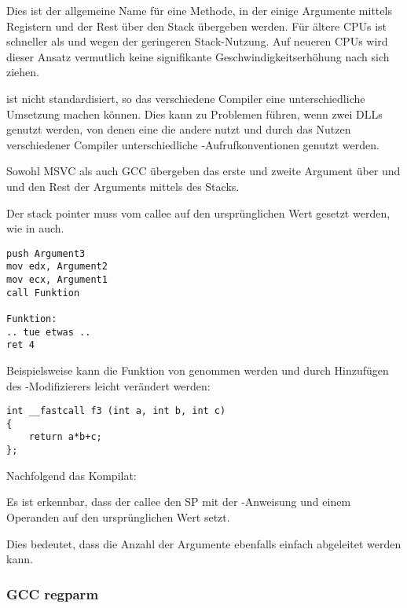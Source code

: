 Dies ist der allgemeine Name für eine Methode, in der einige Argumente mittels Registern und
der Rest über den Stack übergeben werden. Für ältere CPUs ist  schneller als
 und  wegen der geringeren Stack-Nutzung.
Auf neueren \ac{CPU}s wird dieser Ansatz vermutlich keine signifikante Geschwindigkeitserhöhung
nach sich ziehen.

 ist nicht standardisiert, so das verschiedene Compiler eine unterschiedliche
Umsetzung machen können.
Dies kann zu Problemen führen, wenn zwei DLLs genutzt werden, von denen eine die andere nutzt
und durch das Nutzen verschiedener Compiler unterschiedliche -Aufrufkonventionen
genutzt werden.

Sowohl MSVC als auch GCC übergeben das erste und zweite Argument über \ECX und \EDX und den Rest
der Arguments mittels des Stacks.

Der \gls{stack pointer} muss vom \gls{callee} auf den ursprünglichen Wert gesetzt werden,
wie in  auch.

\begin{lstlisting}[caption=fastcall]
push Argument3
mov edx, Argument2
mov ecx, Argument1
call Funktion

Funktion:
.. tue etwas ..
ret 4
\end{lstlisting}

Beispielsweise kann die Funktion von  genommen werden und durch
Hinzufügen des -Modifizierers leicht verändert werden:

\begin{lstlisting}
int __fastcall f3 (int a, int b, int c)
{
	return a*b+c;
};
\end{lstlisting}

Nachfolgend das Kompilat:

%


Es ist erkennbar, dass der \gls{callee} den \ac{SP} mit der -Anweisung
und einem Operanden auf den ursprünglichen Wert setzt.

Dies bedeutet, dass die Anzahl der Argumente ebenfalls einfach abgeleitet werden kann.

\subsubsection{GCC regparm}

